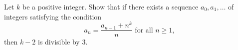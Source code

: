 Let $k$ be a positive integer. Show that if there exists a sequence $a_0,a_1,\ldots$ of integers satisfying the condition \[a_n=\frac{a_{n-1}+n^k}{n}\text{ for all } n\geq 1,\]then $k-2$ is divisible by $3$.